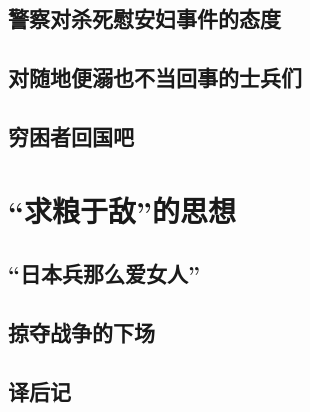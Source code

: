 \documentclass[12pt,UTF8]{ctexbook}
\begin{document}
\section{警察对杀死慰安妇事件的态度}

\section{对随地便溺也不当回事的士兵们}

\section{穷困者回国吧}

\chapter{“求粮于敌”的思想}

\section{“日本兵那么爱女人”}

\section{掠夺战争的下场}

\backmatter

\section{译后记}
\end{document}
